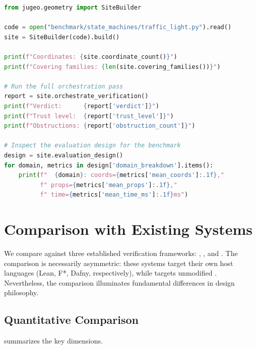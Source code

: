 \begin{lstlisting}[language=Python, caption={Orchestrating the full \JuGeo{} verification pipeline and inspecting the evaluation design.}]
from jugeo.geometry import SiteBuilder

code = open("benchmark/state_machines/traffic_light.py").read()
site = SiteBuilder(code).build()

print(f"Coordinates: {site.coordinate_count()}")
print(f"Covering families: {len(site.covering_families())}")

# Run the full orchestration pass
report = site.orchestrate_verification()
print(f"Verdict:      {report['verdict']}")
print(f"Trust level:  {report['trust_level']}")
print(f"Obstructions: {report['obstruction_count']}")

# Inspect the evaluation design for the benchmark
design = site.evaluation_design()
for domain, metrics in design['domain_breakdown'].items():
    print(f"  {domain}: coords={metrics['mean_coords']:.1f},"
          f" props={metrics['mean_props']:.1f},"
          f" time={metrics['mean_time_ms']:.1f}ms")
\end{lstlisting}


\section{Comparison with Existing Systems}\label{sec:comparison}

We compare \JuGeo{} against three established verification frameworks:
\LEAN{}, \Fstar{}, and \Dafny{}.  The comparison is necessarily
asymmetric: these systems target their own host languages (Lean, F*,
Dafny, respectively), while \JuGeo{} targets unmodified \Python{}.
Nevertheless, the comparison illuminates fundamental differences in
design philosophy.

\subsection{Quantitative Comparison}\label{sec:quant-comparison}

 summarizes the key dimensions.

